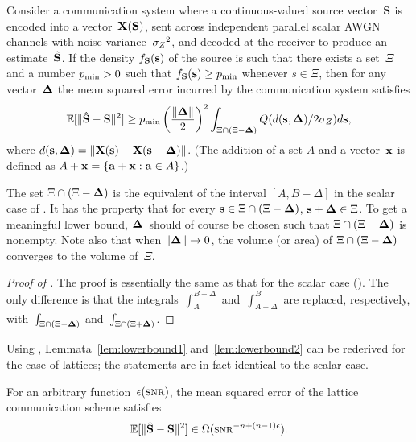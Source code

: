 \begin{lemma}
  \label{lem:zivboundvec}
  Consider a communication system where a continuous-valued source vector~$\S$
  is encoded into a vector~$\X(\S)$, sent across independent parallel scalar
  AWGN channels with noise variance~$\szq$, and decoded at the receiver to
  produce an estimate~$\Shv$. If the density $f_{\S}(\s)$ of the source is such
  that there exists a set~$\Xi$ and a number $\pmin > 0$ such that $f_{\S}(\s)
  \ge \pmin$ whenever $s \in \Xi$, then for any vector~$\Dv$ the mean squared
  error incurred by the communication system satisfies
  \begin{equation*}
    \msev \ge \pmin  \left( \frac{\|\Dv\|}{2}\right)^2 \int_{\Xi \cap (\Xi -
    \Dv)} Q(d(\s, \Dv)/2 \sz) d\s,
  \end{equation*}
  where $d(\s,\Dv) = \|\X(\s) - \X(\s + \Dv)\|$. (The addition of a set $A$ and
  a vector~$\x$ is defined as $A + \x = \{\vect{a} + \x : \vect{a} \in A\}$.)
\end{lemma}

\begin{remark}
  \label{rem:zivboundvec}
  The set $\Xi \cap (\Xi - \Dv)$ is the equivalent of the interval $[A,
  B-\Delta]$ in the scalar case of . It has the property that
  for every $\s \in \Xi \cap (\Xi - \Dv)$, $\s + \Dv \in \Xi$. To get a
  meaningful lower bound, $\Dv$~should of course be chosen such that $\Xi \cap
  (\Xi - \Dv)$ is nonempty.  Note also that when $\|\Dv\| \goesto 0$, the volume
  (or area) of $\Xi \cap (\Xi - \Dv)$ converges to the volume of~$\Xi$.
\end{remark}

\begin{proof}[Proof of ]
  The proof is essentially the same as that for the scalar case
  (). The only difference is that the
  integrals~$\int_A^{B-\Delta}$ and~$\int_{A+\Delta}^B$ are replaced,
  respectively, with~$\int_{\Xi \cap (\Xi - \Dv)}$ and~$\int_{\Xi \cap (\Xi +
  \Dv)}$.
\end{proof}

Using , Lemmata~\ref{lem:lowerbound1}
and~\ref{lem:lowerbound2} can be rederived for the case of lattices; the
statements are in fact identical to the scalar case.

\begin{lemma}
  \label{lem:lowerbound1vec}
  For an arbitrary function~$\e(\snr)$, the mean squared error of the lattice
  communication scheme satisfies
  \begin{equation*}
    \msev \in \Omega(\snr^{-n + (n-1)\e}).
  \end{equation*}
\end{lemma}

